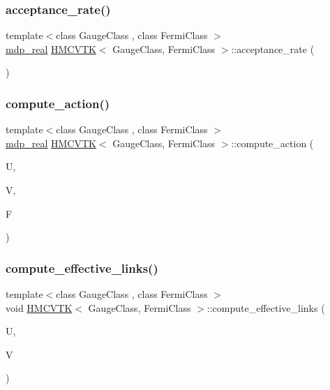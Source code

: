 \subsubsection{\texorpdfstring{acceptance\+\_\+rate()}{acceptance\_rate()}}
{\footnotesize\ttfamily template$<$class Gauge\+Class , class Fermi\+Class $>$ \\
\hyperlink{mdp__global__vars_8h_a69d96b74c791e0bbdb888b3913a69450}{mdp\+\_\+real} \hyperlink{class_h_m_c_v_t_k}{H\+M\+C\+V\+TK}$<$ Gauge\+Class, Fermi\+Class $>$\+::acceptance\+\_\+rate (\begin{DoxyParamCaption}{ }\end{DoxyParamCaption})\hspace{0.3cm}{\ttfamily [inline]}}

\mbox{\label{class_h_m_c_v_t_k_a3f7dc73a7b73b5def83ed6aa81b56baf}} 
\subsubsection{\texorpdfstring{compute\+\_\+action()}{compute\_action()}}
{\footnotesize\ttfamily template$<$class Gauge\+Class , class Fermi\+Class $>$ \\
\hyperlink{mdp__global__vars_8h_a69d96b74c791e0bbdb888b3913a69450}{mdp\+\_\+real} \hyperlink{class_h_m_c_v_t_k}{H\+M\+C\+V\+TK}$<$ Gauge\+Class, Fermi\+Class $>$\+::compute\+\_\+action (\begin{DoxyParamCaption}\item[{Gauge\+Class \&}]{U,  }\item[{Gauge\+Class \&}]{V,  }\item[{Fermi\+Class \&}]{F }\end{DoxyParamCaption})\hspace{0.3cm}{\ttfamily [inline]}}

\mbox{\label{class_h_m_c_v_t_k_a907e9d51b216657fec45d44d7ac56646}} 
\subsubsection{\texorpdfstring{compute\+\_\+effective\+\_\+links()}{compute\_effective\_links()}}
{\footnotesize\ttfamily template$<$class Gauge\+Class , class Fermi\+Class $>$ \\
void \hyperlink{class_h_m_c_v_t_k}{H\+M\+C\+V\+TK}$<$ Gauge\+Class, Fermi\+Class $>$\+::compute\+\_\+effective\+\_\+links (\begin{DoxyParamCaption}\item[{Gauge\+Class \&}]{U,  }\item[{Gauge\+Class \&}]{V }\end{DoxyParamCaption})\hspace{0.3cm}{\ttfamily [inline]}}


